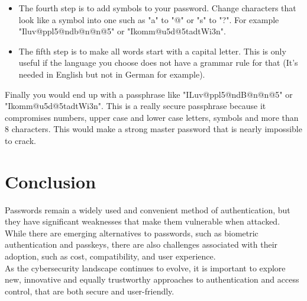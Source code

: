\documentclass[conference]{IEEEtran}
\begin{document}
\begin{enumerate}
\begin{itemize}
              \item The fourth step is to add symbols to your password. Change characters that look like a symbol into one such as "a" to "@" or "s" to "?". For example "Iluv@ppl5@ndb@n@n@5" or "Ikomm@u5d@5tadtWi3n".
              \item The fifth step is to make all words start with a capital letter. This is only useful if the language you choose does not have a grammar rule for that (It's needed in English but not in German for example).
          \end{itemize}
          Finally you would end up with a passphrase like "ILuv@ppl5@ndB@n@n@5" or "Ikomm@u5d@5tadtWi3n". This is a really secure passphrase because it compromises numbers, upper case and lower case letters, symbols and more than 8 characters. This would make a strong master password that is nearly impossible to crack.
\end{enumerate}


\section{Conclusion}
Passwords remain a widely used and convenient method of authentication, but they have significant weaknesses that make them vulnerable when attacked. While there are emerging alternatives to passwords, such as biometric authentication and passkeys, there are also challenges associated with their adoption, such as cost, compatibility, and user experience.\\
As the cybersecurity landscape continues to evolve, it is important to explore new, innovative and equally trustworthy approaches to authentication and access control, that are both secure and user-friendly.


\listoffigures
\end{document}
